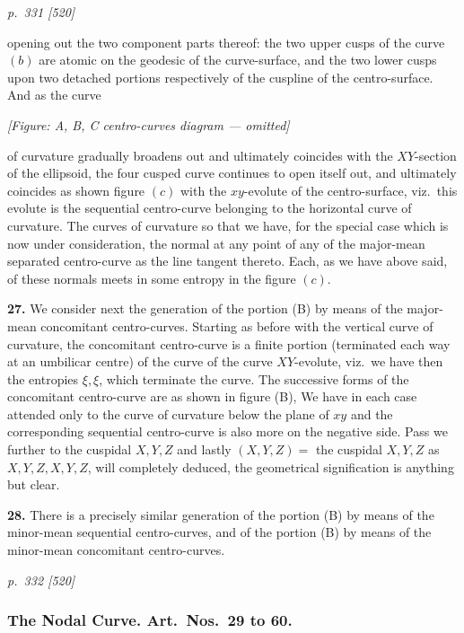 \documentclass[11pt,a4paper]{article}
\theoremstyle{plain}
\theoremstyle{definition}
\begin{document}
\clearpage

\bigskip
\textit{p.~331 [520]}
\smallskip

opening out the two component parts thereof: the two upper cusps of the curve $(b)$ are atomic on the geodesic of the curve-surface, and the two lower cusps upon two detached portions respectively of the cuspline of the centro-surface. And as the curve

\begin{center}
\textit{[Figure: A, B, C centro-curves diagram --- omitted]}
\end{center}

of curvature gradually broadens out and ultimately coincides with the $XY$-section of the ellipsoid, the four cusped curve continues to open itself out, and ultimately coincides as shown figure $(c)$ with the $xy$-evolute of the centro-surface, viz.\ this evolute is the sequential centro-curve belonging to the horizontal curve of curvature. The curves of curvature so that we have, for the special case which is now under consideration, the normal at any point of any of the major-mean separated centro-curve as the line tangent thereto. Each, as we have above said, of these normals meets in some entropy in the figure $(c)$.

\textbf{27.} We consider next the generation of the portion (B) by means of the major-mean concomitant centro-curves. Starting as before with the vertical curve of curvature, the concomitant centro-curve is a finite portion (terminated each way at an umbilicar centre) of the curve of the curve $XY$-evolute, viz.\ we have then the entropies $\xi, \xi$, which terminate the curve. The successive forms of the concomitant centro-curve are as shown in figure (B), We have in each case attended only to the curve of curvature below the plane of $xy$ and the corresponding sequential centro-curve is also more on the negative side. Pass we further to the cuspidal $X, Y, Z$ and lastly $(X, Y, Z) = $ the cuspidal $X, Y, Z$ as $X, Y, Z, X, Y, Z$, will completely deduced, the geometrical signification is anything but clear.

\textbf{28.} There is a precisely similar generation of the portion (B) by means of the minor-mean sequential centro-curves, and of the portion (B) by means of the minor-mean concomitant centro-curves.

\clearpage

\bigskip
\textit{p.~332 [520]}
\smallskip

\subsubsection*{The Nodal Curve. Art.\ Nos.\ 29 to 60.}
\end{document}
